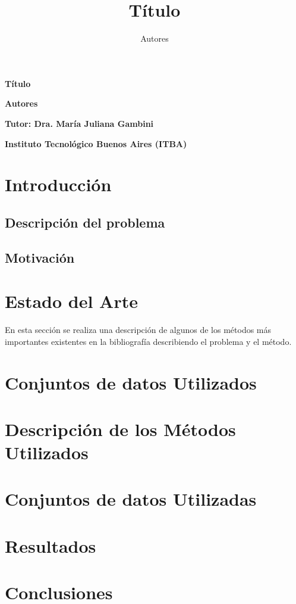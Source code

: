 \documentclass[a4paper,10pt]{article}
\title{Título}
\author{Autores}
\begin{document}
\maketitle

\pagebreak

\tableofcontents

\pagebreak

\begin{center}

\textbf{\Huge{Título}}

\textbf{\newline Autores}

\textbf{\newline Tutor: Dra. María Juliana Gambini}

\textbf{\newline Instituto Tecnológico Buenos Aires (ITBA)}

\end{center}

\section{Introducción}
\subsection{Descripción del problema}

\subsection{Motivación}




\section{Estado del Arte}





En esta sección se realiza una descripción de algunos de los métodos más importantes existentes en la bibliografía describiendo el problema y el método. 
 
\section{Conjuntos de datos Utilizados}

\section{Descripción de los Métodos Utilizados}



\section{Conjuntos de datos Utilizadas}

\section{Resultados}



\section{Conclusiones}





\end{document}
